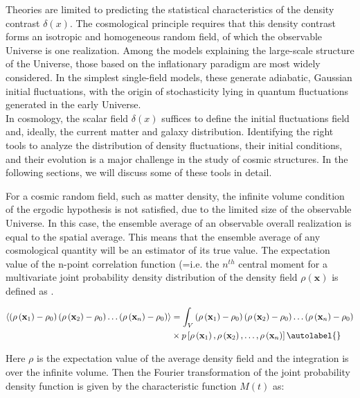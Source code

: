 Theories are limited to predicting the statistical characteristics of the density contrast $\delta(x)$. The cosmological principle requires that this density contrast forms an isotropic and homogeneous random field, of which the observable Universe is one realization. Among the models explaining the large-scale structure of the Universe, those based on the inflationary paradigm are most widely considered. In the simplest single-field models, these generate adiabatic, Gaussian initial fluctuations, with the origin of stochasticity lying in quantum fluctuations generated in the early Universe.\\

In cosmology, the scalar field $\delta(x)$ suffices to define the initial fluctuations field and, ideally, the current matter and galaxy distribution. Identifying the right tools to analyze the distribution of density fluctuations, their initial conditions, and their evolution is a major challenge in the study of cosmic structures. In the following sections, we will discuss some of these tools in detail.


For a cosmic random field, such as matter density, the infinite volume condition of the ergodic hypothesis is not satisfied, due to the limited size of the observable Universe. In this case, the ensemble average of an observable overall realization is equal to the spatial average. This means that the ensemble average of any cosmological quantity will be an estimator of its true value. The expectation value of the n-point correlation function (=i.e. the $n^{th}$ central moment for a multivariate joint probability density distribution of the density field $\rho(\mathbf{x})$ is defined as \cite{gnedenko1998theory}.


\begin{align*}
    \left\langle\left(\rho\left(\mathbf{x}_{1}\right)-\rho_{0}\right)\left(\rho\left(\mathbf{x}_{2}\right)-\rho_{0}\right) \ldots\left(\rho\left(\mathbf{x}_{n}\right)-\rho_{0}\right)\right\rangle & =\int_{V}\left(\rho\left(\mathbf{x}_{1}\right)-\rho_{0}\right)\left(\rho\left(\mathbf{x}_{2}\right)-\rho_{0}\right) \ldots\left(\rho\left(\mathbf{x}_{n}\right)-\rho_{0}\right) \\
    & \times p\left[\rho\left(\mathbf{x}_{1}\right), \rho\left(\mathbf{x}_{2}\right), \ldots, \rho\left(\mathbf{x}_{n}\right)\right] \autolabel{}
\end{align*}


Here $\rho$ is the expectation value of the average density field and the integration is over the infinite volume. Then the  Fourier transformation of the joint probability density function is given by the characteristic function $M(t)$ as:


